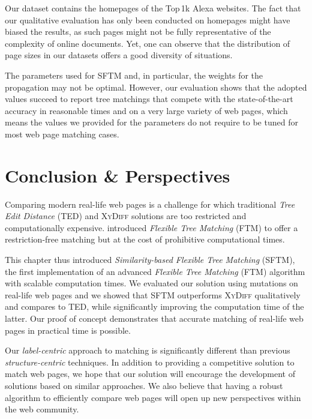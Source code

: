 Our dataset contains the homepages of the Top\,1k Alexa websites.
The fact that our qualitative evaluation has only been conducted on homepages might have biased the results, as such pages might not be fully representative of the complexity of online documents.
Yet, one can observe that the distribution of page sizes in our datasets offers a good diversity of situations.

The parameters used for SFTM and, in particular, the weights for the propagation may not be optimal.
However, our evaluation shows that the adopted values succeed to report tree matchings that compete with the state-of-the-art accuracy in reasonable times and on a very large variety of web pages, which means the values we provided for the parameters do not require to be tuned for most web page matching cases.


\section{Conclusion \& Perspectives}\label{sftm:sec:conclusion}
Comparing modern real-life web pages is a challenge for which traditional \emph{Tree Edit Distance} (TED) and \textsc{XyDiff} solutions are too restricted and computationally expensive. 
\cite{Kumar2011_FTM} introduced \emph{Flexible Tree Matching} (FTM) to offer a restriction-free matching but at the cost of prohibitive computational times.

This chapter thus introduced \emph{Similarity-based Flexible Tree Matching} (SFTM), the first implementation of an advanced \emph{Flexible Tree Matching} (FTM) algorithm with scalable computation times.
We evaluated our solution using mutations on real-life web pages and we showed that SFTM outperforms \textsc{XyDiff} qualitatively and compares to TED, while significantly improving the computation time of the latter.
Our proof of concept demonstrates that accurate matching of real-life web pages in practical time is possible.

Our \textit{label-centric} approach to matching is significantly different than previous \textit{structure-centric} techniques.
In addition to providing a competitive solution to match web pages, we hope that our solution will encourage the development of solutions based on similar approaches.
We also believe that having a robust algorithm to efficiently compare web pages will open up new perspectives within the web community.

